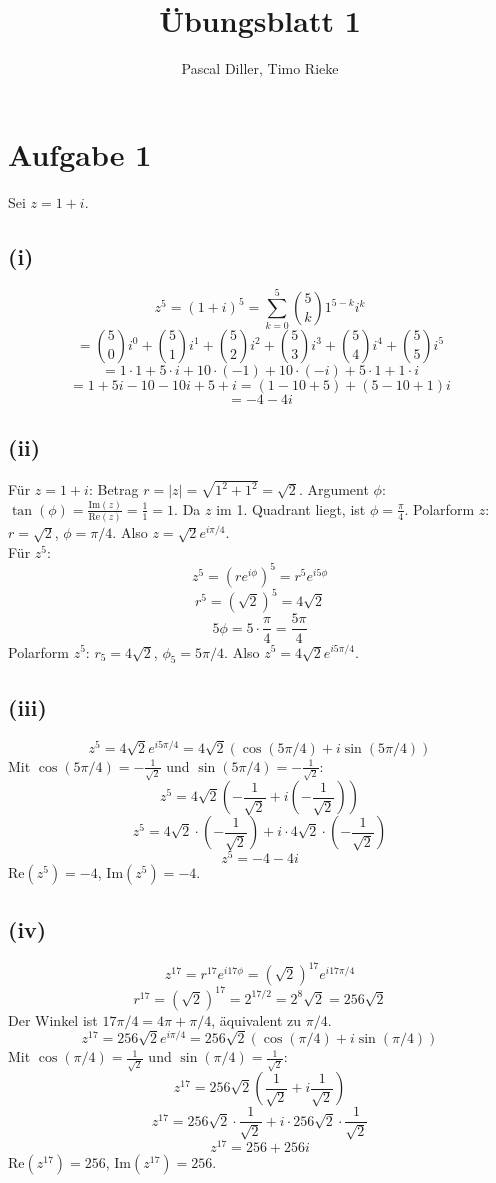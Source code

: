 \documentclass{article}
\title{Übungsblatt 1}
\author{Pascal Diller, Timo Rieke}
\begin{document}
\maketitle

\section*{Aufgabe 1}
Sei $z=1+i$.

\subsection*{(i)}
\[ z^5 = (1+i)^5 = \sum_{k=0}^{5} \binom{5}{k} 1^{5-k} i^k \]
\[ = \binom{5}{0}i^0 + \binom{5}{1}i^1 + \binom{5}{2}i^2 + \binom{5}{3}i^3 + \binom{5}{4}i^4 + \binom{5}{5}i^5 \]
\[ = 1 \cdot 1 + 5 \cdot i + 10 \cdot (-1) + 10 \cdot (-i) + 5 \cdot 1 + 1 \cdot i \]
\[ = 1 + 5i - 10 - 10i + 5 + i = (1-10+5) + (5-10+1)i \]
\[ = -4 - 4i \]

\subsection*{(ii)}
Für $z = 1+i$: Betrag $r = |z| = \sqrt{1^2+1^2} = \sqrt{2}$.
Argument $\phi$: $\tan(\phi) = \frac{\text{Im}(z)}{\text{Re}(z)} = \frac{1}{1} = 1$. Da $z$ im 1. Quadrant liegt, ist $\phi = \frac{\pi}{4}$.
Polarform $z$: $r=\sqrt{2}$, $\phi=\pi/4$. Also $z = \sqrt{2}e^{i\pi/4}$. \\ \newline  
Für $z^5$:
\[ z^5 = (re^{i\phi})^5 = r^5 e^{i5\phi} \]
\[ r^5 = (\sqrt{2})^5 = 4\sqrt{2} \]
\[ 5\phi = 5 \cdot \frac{\pi}{4} = \frac{5\pi}{4} \]
Polarform $z^5$: $r_5=4\sqrt{2}$, $\phi_5=5\pi/4$. Also $z^5 = 4\sqrt{2}e^{i5\pi/4}$.

\subsection*{(iii)}
\[ z^5 = 4\sqrt{2} e^{i5\pi/4} = 4\sqrt{2} (\cos(5\pi/4) + i\sin(5\pi/4)) \]
Mit $\cos(5\pi/4) = -\frac{1}{\sqrt{2}}$ und $\sin(5\pi/4) = -\frac{1}{\sqrt{2}}$:
\[ z^5 = 4\sqrt{2} (-\frac{1}{\sqrt{2}} + i(-\frac{1}{\sqrt{2}})) \]
\[ z^5 = 4\sqrt{2} \cdot (-\frac{1}{\sqrt{2}}) + i \cdot 4\sqrt{2} \cdot (-\frac{1}{\sqrt{2}}) \]
\[ z^5 = -4 - 4i \]
$\text{Re}(z^5) = -4$, $\text{Im}(z^5) = -4$.

\subsection*{(iv)}
\[ z^{17} = r^{17} e^{i17\phi} = (\sqrt{2})^{17} e^{i17\pi/4} \]
\[ r^{17} = (\sqrt{2})^{17} = 2^{17/2} = 2^8 \sqrt{2} = 256\sqrt{2} \]
Der Winkel ist $17\pi/4 = 4\pi + \pi/4$, äquivalent zu $\pi/4$.
\[ z^{17} = 256\sqrt{2} e^{i\pi/4} = 256\sqrt{2} (\cos(\pi/4) + i\sin(\pi/4)) \]
Mit $\cos(\pi/4) = \frac{1}{\sqrt{2}}$ und $\sin(\pi/4) = \frac{1}{\sqrt{2}}$:
\[ z^{17} = 256\sqrt{2} (\frac{1}{\sqrt{2}} + i\frac{1}{\sqrt{2}}) \]
\[ z^{17} = 256\sqrt{2} \cdot \frac{1}{\sqrt{2}} + i \cdot 256\sqrt{2} \cdot \frac{1}{\sqrt{2}} \]
\[ z^{17} = 256 + 256i \]
$\text{Re}(z^{17}) = 256$, $\text{Im}(z^{17}) = 256$.
\end{document}
